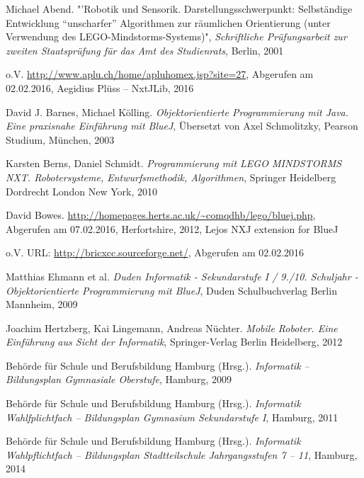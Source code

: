 \begin{thebibliography}{ABCDEF}

\renewcommand{\refname}{\normalsize Literaturverzeichnis}

Michael Abend. "'Robotik und Sensorik. Darstellungsschwerpunkt: Selbständige Entwicklung "`unscharfer"' Algorithmen zur räumlichen Orientierung (unter Verwendung des LEGO-Mindstorms-Systems)", \emph{Schriftliche Prüfungsarbeit zur zweiten Staatsprüfung für das Amt des Studienrats}, Berlin, 2001

o.V. \url{http://www.aplu.ch/home/apluhomex.jsp?site=27}, Abgerufen am 02.02.2016, Aegidius Plüss -- NxtJLib, 2016

David J. Barnes, Michael Kölling. \emph{Objektorientierte Programmierung mit Java. Eine praxisnahe Einführung mit BlueJ}, Übersetzt von Axel Schmolitzky, Pearson Studium, München, 2003

Karsten Berns, Daniel Schmidt. \emph{Programmierung mit LEGO MINDSTORMS NXT. Robotersysteme, Entwurfsmethodik, Algorithmen}, Springer Heidelberg Dordrecht London New York, 2010

David Bowes. \url{http://homepages.herts.ac.uk/~comqdhb/lego/bluej.php}, Abgerufen am 07.02.2016, Herfortshire, 2012, Lejos NXJ extension for BlueJ

o.V. URL: \url{http://bricxcc.sourceforge.net/}, Abgerufen am 02.02.2016

Matthias Ehmann et al. \emph{Duden Informatik - Sekundarstufe I / 9./10. Schuljahr - Objektorientierte Programmierung mit BlueJ}, Duden Schulbuchverlag Berlin Mannheim, 2009

Joachim Hertzberg, Kai Lingemann, Andreas Nüchter. \emph{Mobile Roboter. Eine Einführung aus Sicht der Informatik}, Springer-Verlag Berlin Heidelberg, 2012

Behörde für Schule und Berufsbildung Hamburg (Hrsg.). \emph{Informatik -- Bildungsplan  Gymnasiale Oberstufe}, Hamburg, 2009

Behörde für Schule und Berufsbildung Hamburg (Hrsg.). \emph{Informatik Wahlfplichtfach -- Bildungsplan Gymnasium Sekundarstufe I}, Hamburg, 2011

Behörde für Schule und Berufsbildung Hamburg (Hrsg.). \emph{Informatik Wahlpflichtfach -- Bildungsplan Stadtteilschule Jahrgangsstufen 7 -- 11}, Hamburg, 2014


\end{thebibliography}

